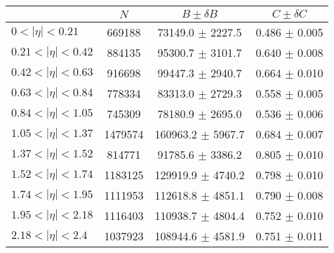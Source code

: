 \begin{tabular}{lccc}
\hline
    &   $N$   & $B \pm \delta B$  &  $C \pm \delta C$ \\
\hline
$0 < |\eta| <0.21$             & 669188     & 73149.0    $\pm$ 2227.5 & 0.486      $\pm$ 0.005 \\
$0.21 < |\eta| <0.42$          & 884135     & 95300.7    $\pm$ 3101.7 & 0.640      $\pm$ 0.008 \\
$0.42 < |\eta| <0.63$          & 916698     & 99447.3    $\pm$ 2940.7 & 0.664      $\pm$ 0.010 \\
$0.63 < |\eta| <0.84$          & 778334     & 83313.0    $\pm$ 2729.3 & 0.558      $\pm$ 0.005 \\
$0.84 < |\eta| <1.05$          & 745309     & 78180.9    $\pm$ 2695.0 & 0.536      $\pm$ 0.006 \\
$1.05 < |\eta| <1.37$          & 1479574    & 160963.2   $\pm$ 5967.7 & 0.684      $\pm$ 0.007 \\
$1.37 < |\eta| <1.52$          & 814771     & 91785.6    $\pm$ 3386.2 & 0.805      $\pm$ 0.010 \\
$1.52 < |\eta| <1.74$          & 1183125    & 129919.9   $\pm$ 4740.2 & 0.798      $\pm$ 0.010 \\
$1.74 < |\eta| <1.95$          & 1111953    & 112618.8   $\pm$ 4851.1 & 0.790      $\pm$ 0.008 \\
$1.95 < |\eta| <2.18$          & 1116403    & 110938.7   $\pm$ 4804.4 & 0.752      $\pm$ 0.010 \\
$2.18 < |\eta| <2.4$           & 1037923    & 108944.6   $\pm$ 4581.9 & 0.751      $\pm$ 0.011 \\
\hline
\end{tabular}
